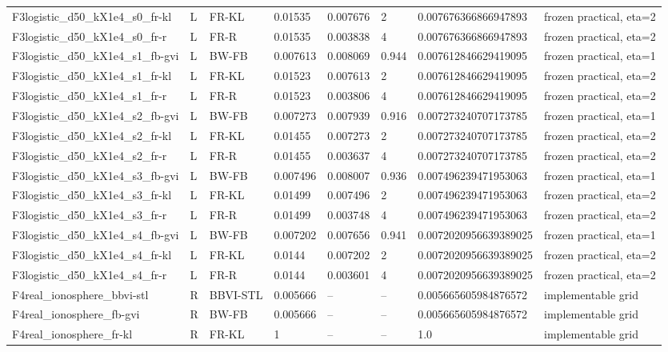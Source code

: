 \begin{tabular}{llllllll}
F3logistic\_d50\_kX1e4\_s0\_fr-kl & L & FR-KL & 0.01535 & 0.007676 & 2 & 0.007676366866947893 & frozen practical, eta=2 \\
F3logistic\_d50\_kX1e4\_s0\_fr-r & L & FR-R & 0.01535 & 0.003838 & 4 & 0.007676366866947893 & frozen practical, eta=2 \\
F3logistic\_d50\_kX1e4\_s1\_fb-gvi & L & BW-FB & 0.007613 & 0.008069 & 0.944 & 0.007612846629419095 & frozen practical, eta=1 \\
F3logistic\_d50\_kX1e4\_s1\_fr-kl & L & FR-KL & 0.01523 & 0.007613 & 2 & 0.007612846629419095 & frozen practical, eta=2 \\
F3logistic\_d50\_kX1e4\_s1\_fr-r & L & FR-R & 0.01523 & 0.003806 & 4 & 0.007612846629419095 & frozen practical, eta=2 \\
F3logistic\_d50\_kX1e4\_s2\_fb-gvi & L & BW-FB & 0.007273 & 0.007939 & 0.916 & 0.007273240707173785 & frozen practical, eta=1 \\
F3logistic\_d50\_kX1e4\_s2\_fr-kl & L & FR-KL & 0.01455 & 0.007273 & 2 & 0.007273240707173785 & frozen practical, eta=2 \\
F3logistic\_d50\_kX1e4\_s2\_fr-r & L & FR-R & 0.01455 & 0.003637 & 4 & 0.007273240707173785 & frozen practical, eta=2 \\
F3logistic\_d50\_kX1e4\_s3\_fb-gvi & L & BW-FB & 0.007496 & 0.008007 & 0.936 & 0.007496239471953063 & frozen practical, eta=1 \\
F3logistic\_d50\_kX1e4\_s3\_fr-kl & L & FR-KL & 0.01499 & 0.007496 & 2 & 0.007496239471953063 & frozen practical, eta=2 \\
F3logistic\_d50\_kX1e4\_s3\_fr-r & L & FR-R & 0.01499 & 0.003748 & 4 & 0.007496239471953063 & frozen practical, eta=2 \\
F3logistic\_d50\_kX1e4\_s4\_fb-gvi & L & BW-FB & 0.007202 & 0.007656 & 0.941 & 0.0072020956639389025 & frozen practical, eta=1 \\
F3logistic\_d50\_kX1e4\_s4\_fr-kl & L & FR-KL & 0.0144 & 0.007202 & 2 & 0.0072020956639389025 & frozen practical, eta=2 \\
F3logistic\_d50\_kX1e4\_s4\_fr-r & L & FR-R & 0.0144 & 0.003601 & 4 & 0.0072020956639389025 & frozen practical, eta=2 \\
F4real\_ionosphere\_bbvi-stl & R & BBVI-STL & 0.005666 & -- & -- & 0.005665605984876572 & implementable grid \\
F4real\_ionosphere\_fb-gvi & R & BW-FB & 0.005666 & -- & -- & 0.005665605984876572 & implementable grid \\
F4real\_ionosphere\_fr-kl & R & FR-KL & 1 & -- & -- & 1.0 & implementable grid \\

\end{tabular}

